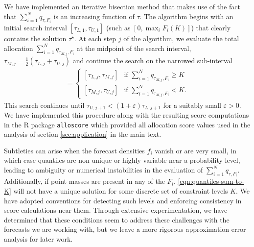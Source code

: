 \documentclass{article}
\begin{document}
We have implemented an iterative bisection method that makes use of the fact that $\sum_{i=1}^N q_{\tau,F_i}$
is an increasing function of $\tau$.
The algorithm begins with an initial search interval $[\tau_{L,1}, \tau_{U,1}]$ (such as $[0,\max_{i}F_i(K)]$) that clearly contains
the solution $\tau^{\star}$.
At each step $j$ of the algorithm, we evaluate the total allocation $\sum_{i=1}^N q_{\tau_{M,j},F_i}$ at the midpoint of the search interval,
$\tau_{M,j} = \frac{1}{2}(\tau_{L,j} + \tau_{U,j})$ and continue the search on the narrowed sub-interval
\begin{align}
[\tau_{L,j+1},\tau_{U,j+1}] =
\begin{cases}
[\tau_{L,j}, \tau_{M,j}] & \text{if } \sum_{i=1}^N q_{\tau_{M,j},F_i} \geq K \\
[\tau_{M,j}, \tau_{U,j}] & \text{if } \sum_{i=1}^N q_{\tau_{M,j},F_i} < K.
\end{cases} \nonumber
\end{align}
This search continues until $\tau_{U,j+1} < (1+\varepsilon)\tau_{L,j+1}$ for a suitably small $\varepsilon>0$.
We have implemented this procedure along with the resulting score computations in the
R package \verb`alloscore` \citep{gerding-alloscore} which provided all allocation score values used in the analysis of section \ref{sec:application}
in the main text.

Subtleties can arise when the forecast
densities $f_i$ vanish or are very small, in which case quantiles are non-unique or highly variable near a probability level,
leading to ambiguity or numerical instabilities{} in the evaluation of $\sum_{i=1}^N q_{\tau,F_i}$. Additionally, if point masses are present in any of the $F_i$,
\eqref{eqn:quantiles-sum-to-K} will not have a unique solution for some discrete set of constraint levels $K$.
We have adopted conventions for detecting such levels and enforcing consistency in score calculations
near them. Through extensive experimentation, we have determined that these conditions seem to address these challenges with the forecasts we are working with, but we leave a more rigorous approximation error analysis for later work.
\end{document}

